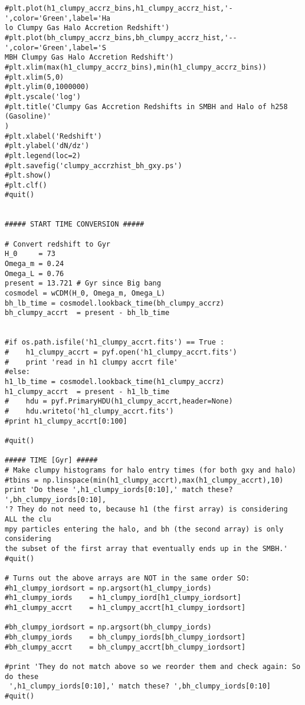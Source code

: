 \documentclass[12pt,headA,chapB]{fiskthesis}
\begin{document}
\begin{verbatim}
#plt.plot(h1_clumpy_accrz_bins,h1_clumpy_accrz_hist,'-',color='Green',label='Ha
lo Clumpy Gas Halo Accretion Redshift')
#plt.plot(bh_clumpy_accrz_bins,bh_clumpy_accrz_hist,'--',color='Green',label='S
MBH Clumpy Gas Halo Accretion Redshift')
#plt.xlim(max(h1_clumpy_accrz_bins),min(h1_clumpy_accrz_bins))
#plt.xlim(5,0)
#plt.ylim(0,1000000)
#plt.yscale('log')
#plt.title('Clumpy Gas Accretion Redshifts in SMBH and Halo of h258 (Gasoline)'
)
#plt.xlabel('Redshift')
#plt.ylabel('dN/dz')
#plt.legend(loc=2)
#plt.savefig('clumpy_accrzhist_bh_gxy.ps')
#plt.show()
#plt.clf()
#quit()


##### START TIME CONVERSION #####

# Convert redshift to Gyr
H_0     = 73 
Omega_m = 0.24
Omega_L = 0.76
present = 13.721 # Gyr since Big bang
cosmodel = wCDM(H_0, Omega_m, Omega_L)
bh_lb_time = cosmodel.lookback_time(bh_clumpy_accrz)
bh_clumpy_accrt  = present - bh_lb_time


#if os.path.isfile('h1_clumpy_accrt.fits') == True :
#    h1_clumpy_accrt = pyf.open('h1_clumpy_accrt.fits')
#    print 'read in h1 clumpy accrt file'
#else:
h1_lb_time = cosmodel.lookback_time(h1_clumpy_accrz) 
h1_clumpy_accrt  = present - h1_lb_time
#    hdu = pyf.PrimaryHDU(h1_clumpy_accrt,header=None)
#    hdu.writeto('h1_clumpy_accrt.fits')
#print h1_clumpy_accrt[0:100]

#quit()

##### TIME [Gyr] #####
# Make clumpy histograms for halo entry times (for both gxy and halo) 
#tbins = np.linspace(min(h1_clumpy_accrt),max(h1_clumpy_accrt),10)
print 'Do these ',h1_clumpy_iords[0:10],' match these? ',bh_clumpy_iords[0:10],
'? They do not need to, because h1 (the first array) is considering ALL the clu
mpy particles entering the halo, and bh (the second array) is only considering 
the subset of the first array that eventually ends up in the SMBH.'
#quit()

# Turns out the above arrays are NOT in the same order SO:
#h1_clumpy_iordsort = np.argsort(h1_clumpy_iords)
#h1_clumpy_iords    = h1_clumpy_iord[h1_clumpy_iordsort]
#h1_clumpy_accrt    = h1_clumpy_accrt[h1_clumpy_iordsort]

#bh_clumpy_iordsort = np.argsort(bh_clumpy_iords)
#bh_clumpy_iords    = bh_clumpy_iords[bh_clumpy_iordsort]
#bh_clumpy_accrt    = bh_clumpy_accrt[bh_clumpy_iordsort]

#print 'They do not match above so we reorder them and check again: So do these
 ',h1_clumpy_iords[0:10],' match these? ',bh_clumpy_iords[0:10]
#quit()


\end{verbatim}
\end{document}
